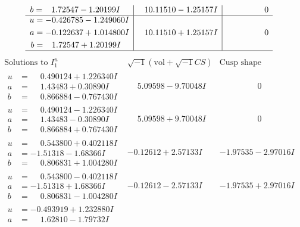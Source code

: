 \documentclass[1p]{elsarticle_modified}
\theoremstyle{definition}
\newcommand{\I}{\sqrt{-1}}
\begin{document}
$$\begin{array}{c|c|c}
\begin{aligned}
b &= \phantom{-}1.72547 - 1.20199 I\end{aligned}
 & \phantom{-}10.11510 - 1.25157 I & \phantom{-0.000000 } 0 \\ \hline\begin{aligned}
u &= -0.426785 - 1.249060 I \\
a &= -0.122637 + 1.014800 I \\
b &= \phantom{-}1.72547 + 1.20199 I\end{aligned}
 & \phantom{-}10.11510 + 1.25157 I & \phantom{-0.000000 } 0\\
 \hline 
 \end{array}$$\newpage$$\begin{array}{c|c|c}  
\text{Solutions to }I^u_{1}& \I (\text{vol} + \sqrt{-1}CS) & \text{Cusp shape}\\
 \hline 
\begin{aligned}
u &= \phantom{-}0.490124 + 1.226340 I \\
a &= \phantom{-}1.43483 + 0.30890 I \\
b &= \phantom{-}0.866884 - 0.767430 I\end{aligned}
 & \phantom{-}5.09598 - 9.70048 I & \phantom{-0.000000 } 0 \\ \hline\begin{aligned}
u &= \phantom{-}0.490124 - 1.226340 I \\
a &= \phantom{-}1.43483 - 0.30890 I \\
b &= \phantom{-}0.866884 + 0.767430 I\end{aligned}
 & \phantom{-}5.09598 + 9.70048 I & \phantom{-0.000000 } 0 \\ \hline\begin{aligned}
u &= \phantom{-}0.543800 + 0.402118 I \\
a &= -1.51318 - 1.68366 I \\
b &= \phantom{-}0.806831 + 1.004280 I\end{aligned}
 & -0.12612 + 2.57133 I & -1.97535 - 2.97016 I \\ \hline\begin{aligned}
u &= \phantom{-}0.543800 - 0.402118 I \\
a &= -1.51318 + 1.68366 I \\
b &= \phantom{-}0.806831 - 1.004280 I\end{aligned}
 & -0.12612 - 2.57133 I & -1.97535 + 2.97016 I \\ \hline\begin{aligned}
u &= -0.493919 + 1.232880 I \\
a &= \phantom{-}1.62810 - 1.79732 I \\

\end{aligned}
\end{array}$$
\end{document}
